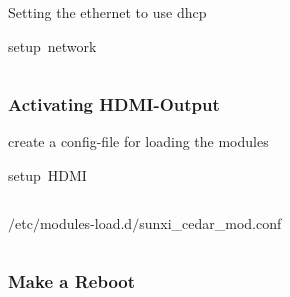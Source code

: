 \documentclass[11pt, a4paper,ngerman]{article}
\begin{document}
Setting the ethernet to use dhcp \\

\begin{mintedbox}[breakable=true,
 bottomrule=0.5mm,
 width=\paperwidth-3cm,
 boxsep=1mm, 
 enhanced=true,
 colframe = monoblack,
 drop fuzzy shadow,
 colback = black
 ]{setup\ network}%
 

     \inputminted[firstline=83,lastline=84, 
     linenos=true, framesep=2mm, mathescape, numbersep=5pt,tabsize=4,%
]{bash}{includes/archlinux.sh}%

\end{mintedbox}%
\vspace{-0.4cm}

\subsubsection{Activating HDMI-Output}

create a config-file for loading the modules \\

\begin{mintedbox}[breakable=true,
 bottomrule=0.5mm,
 width=\paperwidth-3cm,
 boxsep=1mm, 
 enhanced=true,
 colframe = monoblack,
 drop fuzzy shadow,
 colback = black
 ]{setup\ HDMI}%
 

     \inputminted[firstline=88,lastline=88, 
     linenos=true, framesep=2mm, mathescape, numbersep=5pt,tabsize=4,%
]{bash}{includes/archlinux.sh}%

\end{mintedbox}%

\vspace{0.4cm}
\begin{mintedbox}[breakable=true,
 bottomrule=0.5mm,
 width=\paperwidth-3cm,
 boxsep=1mm, 
 enhanced=true,
 colframe = monoblack,
 drop fuzzy shadow,
 colback = black
 ]{$/$etc$/$modules-load.d$/$sunxi\_cedar\_mod.conf}%
 

     \inputminted[firstline=92,lastline=103, 
     linenos=true, framesep=2mm, mathescape, numbersep=5pt,tabsize=4,%
]{bash}{includes/archlinux.sh}%

\end{mintedbox}%
\vspace{-0.4cm}

\subsubsection{Make a Reboot}
\end{document}
